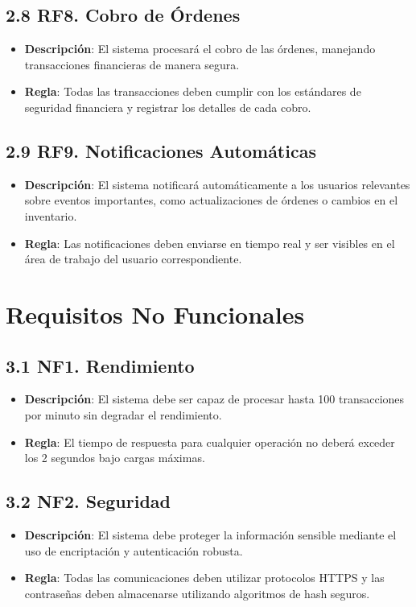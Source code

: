 \documentclass{article}
\begin{document}
\subsection{2.8 RF8. Cobro de Órdenes}
\begin{itemize}
    \item \textbf{Descripción}: El sistema procesará el cobro de las órdenes, manejando transacciones financieras de manera segura.
    \item \textbf{Regla}: Todas las transacciones deben cumplir con los estándares de seguridad financiera y registrar los detalles de cada cobro.
\end{itemize}

\subsection{2.9 RF9. Notificaciones Automáticas}
\begin{itemize}
    \item \textbf{Descripción}: El sistema notificará automáticamente a los usuarios relevantes sobre eventos importantes, como actualizaciones de órdenes o cambios en el inventario.
    \item \textbf{Regla}: Las notificaciones deben enviarse en tiempo real y ser visibles en el área de trabajo del usuario correspondiente.
\end{itemize}

\newpage
\section{Requisitos No Funcionales}
\subsection{3.1 NF1. Rendimiento}
\begin{itemize}
    \item \textbf{Descripción}: El sistema debe ser capaz de procesar hasta 100 transacciones por minuto sin degradar el rendimiento.
    \item \textbf{Regla}: El tiempo de respuesta para cualquier operación no deberá exceder los 2 segundos bajo cargas máximas.
\end{itemize}

\subsection{3.2 NF2. Seguridad}
\begin{itemize}
    \item \textbf{Descripción}: El sistema debe proteger la información sensible mediante el uso de encriptación y autenticación robusta.
    \item \textbf{Regla}: Todas las comunicaciones deben utilizar protocolos HTTPS y las contraseñas deben almacenarse utilizando algoritmos de hash seguros.
\end{itemize}
\end{document}
